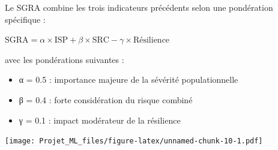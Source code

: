\documentclass[
]{article}
\providecommand{\tightlist}{%
  \setlength{\itemsep}{0pt}\setlength{\parskip}{0pt}}
\begin{document}
Le SGRA combine les trois indicateurs précédents selon une pondération
spécifique :

\(\text{SGRA} = \alpha \times \text{ISP} + \beta \times \text{SRC} - \gamma \times \text{Résilience}\)

avec les pondérations suivantes :

\begin{itemize}
\tightlist
\item
  α = 0.5 : importance majeure de la sévérité populationnelle
\item
  β = 0.4 : forte considération du risque combiné
\item
  γ = 0.1 : impact modérateur de la résilience
\end{itemize}

\texttt{[image: Projet\_ML\_files/figure-latex/unnamed-chunk-10-1.pdf]}
\end{document}
